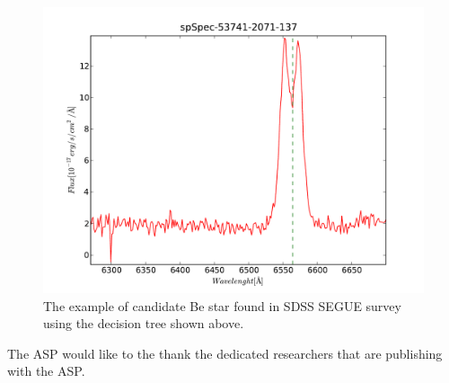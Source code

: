 \documentclass[11pt,twoside]{article}
\begin{document}
\begin{center}
\begin{figure}[!htbp]
  \begin{center}
    \leavevmode
    \includegraphics[scale = .5]{result1}
    \caption{The example of candidate Be star found in SDSS
      SEGUE survey using the decision tree shown above.}
    \label{FigConvolution}
  \end{center}
\end{figure}

\end{center}


%
%



\acknowledgements The ASP would like to the thank the dedicated researchers that are publishing with the ASP.


%
%
\end{document}
